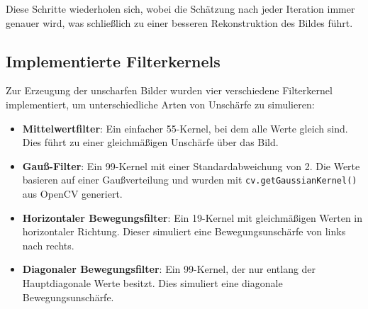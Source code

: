 Diese Schritte wiederholen sich, wobei die Schätzung nach jeder Iteration immer genauer wird, was schließlich zu einer besseren Rekonstruktion des Bildes führt.




\newpage
\subsection{Implementierte Filterkernels}

Zur Erzeugung der unscharfen Bilder wurden vier verschiedene Filterkernel implementiert, um unterschiedliche Arten von Unschärfe zu simulieren:

\begin{itemize}
    \item \textbf{Mittelwertfilter}: Ein einfacher 5{\texttimes}5-Kernel, bei dem alle Werte gleich sind. Dies führt zu einer gleichmäßigen Unschärfe über das Bild.
    
    \item \textbf{Gauß-Filter}: Ein 9{\texttimes}9-Kernel mit einer Standardabweichung von 2. Die Werte basieren auf einer Gaußverteilung und wurden mit \texttt{cv.getGaussianKernel()} aus OpenCV generiert.
    
    \item \textbf{Horizontaler Bewegungsfilter}: Ein 1{\texttimes}9-Kernel mit gleichmäßigen Werten in horizontaler Richtung. Dieser simuliert eine Bewegungsunschärfe von links nach rechts.
    
    \item \textbf{Diagonaler Bewegungsfilter}: Ein 9{\texttimes}9-Kernel, der nur entlang der Hauptdiagonale Werte besitzt. Dies simuliert eine diagonale Bewegungsunschärfe.
\end{itemize}
